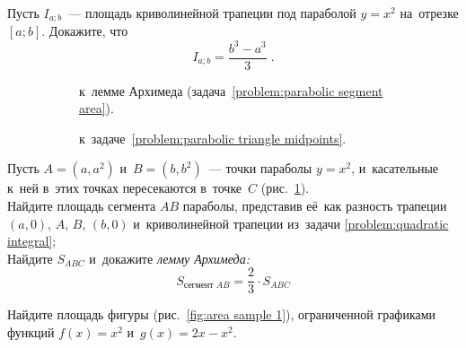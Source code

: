 \begin{problems}

\item\label{problem:quadratic integral}%
Пусть $I_{a;b}$~--- площадь криволинейной трапеции под параболой $y = x^2$
на~отрезке $[a; b]$.
Докажите, что
\[
    I_{a;b}
=
    \frac{b^3 - a^3}{3}
\;.\]

\begin{figure}[ht]\begin{center}
\strut\hfill
    \begin{subfigure}{0.45\textwidth}\begin{center}
        \caption{к~лемме Архимеда
            (задача~\ref{problem:parabolic segment area}).}
        \label{fig:parabolic segment area}
    \end{center}\end{subfigure}
\hfill
    \begin{subfigure}{0.45\textwidth}\begin{center}
        \caption{к~задаче~\ref{problem:parabolic triangle midpoints}.}
        \label{fig:parabolic triangle midpoints}
    \end{center}\end{subfigure}
\hfill\strut
\caption{}
\end{center}\end{figure}

\item\label{problem:parabolic segment area}%
Пусть $A = (a, a^2)$ и~$B = (b, b^2)$~--- точки параболы $y = x^2$,
и~касательные к~ней в~этих точках пересекаются в~точке~$C$
(рис.~\ref{fig:parabolic segment area}).
\\
\subproblem
Найдите площадь сегмента $AB$ параболы, представив её~как разность трапеции
$(a,0)$, $A$, $B$, $(b,0)$ и~криволинейной трапеции из~задачи
\ref{problem:quadratic integral};
\\
\subproblem
Найдите $S_{ABC}$ и~докажите \emph{лемму Архимеда:}
\[
    S_{\text{сегмент $AB$}}
=
    \frac{2}{3} \cdot S_{ABC}
\]

\item\label{problem:area sample 1}%
Найдите площадь фигуры (рис.~\ref{fig:area sample 1}), ограниченной графиками
функций $f(x) = x^2$ и~$g(x) = 2 x - x^2$.


\end{problems}
